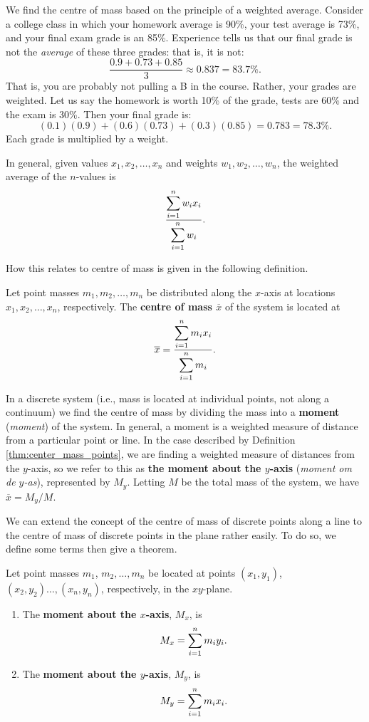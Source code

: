 We find the centre of mass based on the principle of a weighted average. Consider a college class in which your homework average is 90\%, your test average is 73\%, and your final exam grade is an 85\%. Experience tells us that our final grade is not the \textit{average} of these three grades: that is, it is not:
$$\frac{0.9+0.73+0.85}{3} \approx 0.837 = 83.7\text{\%}.$$
That is, you are probably not pulling a B in the course. Rather, your grades are weighted. Let us say the homework is worth 10\% of the grade, tests are 60\% and the exam is 30\%. Then your final grade is:
$$(0.1)(0.9) + (0.6)(0.73)+(0.3)(0.85) = 0.783 = 78.3\text{\%}.$$
Each grade is multiplied by a weight. 

In general, given values $x_1,x_2,\ldots,x_n$ and weights $w_1,w_2,\ldots,w_n$, the weighted average of the $n$-values is
$$\dfrac{\displaystyle\sum_{i=1}^n w_ix_i}{\displaystyle\sum_{i=1}^n w_i}.$$

How this relates to centre of mass is given in the following definition.

\begin{definition}\label{thm:center_mass_points}
Let point masses $m_1,m_2,\ldots,m_n$ be distributed along the $x$-axis at locations $x_1,x_2,\ldots,x_n$, respectively. The \textbf{centre of mass $\overline{x}$} of the system is located at
$$\overline{x} = \dfrac{\displaystyle\sum_{i=1}^nm_ix_i}{\displaystyle\sum_{i=1}^n m_i}.$$
\end{definition}

In a discrete system (i.e., mass is located at individual points, not along a continuum) we find the centre of mass by dividing the mass into a \textbf{moment} (\textit{moment}) of the system. In general, a moment is a weighted measure of distance from a particular point or line. In the case described by Definition \ref{thm:center_mass_points}, we are finding a weighted measure of distances from the $y$-axis, so we refer to this as \textbf{the moment about the $y$-axis} (\textit{moment om de $y$-as}), represented by $M_y$.  Letting $M$ be the total mass of the system, we have  $\overline{x} = M_y/M$. 

We can extend the concept of the centre of mass of discrete points along a line to the centre of mass of discrete points in the plane rather easily. To do so, we define some terms then give a theorem.


\begin{definition}\label{def:moment}
Let point masses $m_1$, $m_2,\ldots,m_n$ be located at points $(x_1,y_1)$, $(x_2,y_2)\ldots,(x_n,y_n)$, respectively, in the $xy$-plane. 
\begin{enumerate}
	\item The \textbf{moment about the $x$-axis}, $M_x$, is 
	$$\displaystyle M_x = \sum_{i=1}^n m_iy_i.$$
	\item The \textbf{moment about the $y$-axis}, $M_y$, is 
	$$\displaystyle M_y = \sum_{i=1}^n m_ix_i.$$
	\end{enumerate}
\end{definition}

